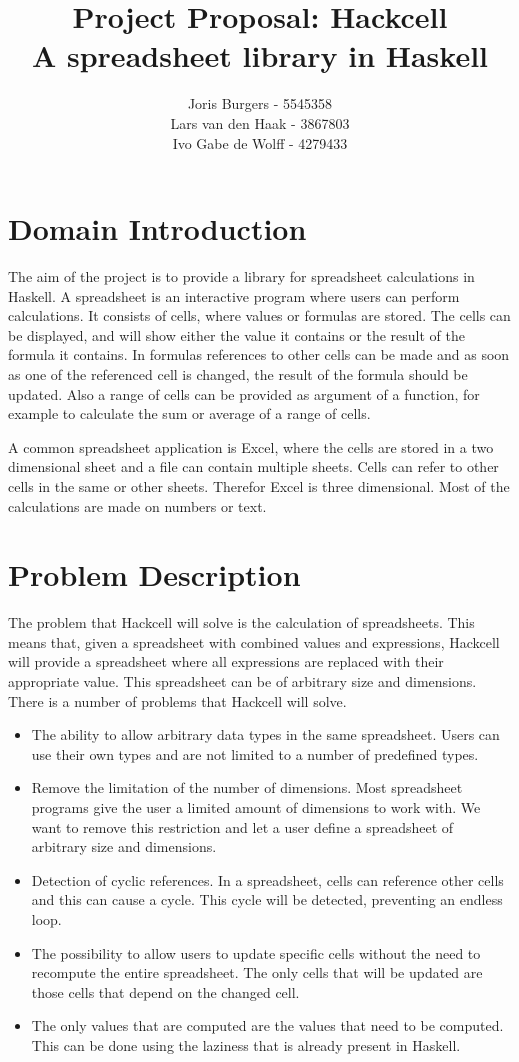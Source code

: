\documentclass{article}
\title{
	Project Proposal: Hackcell \\
	\vskip 0.5cm
	\large{A spreadsheet library in Haskell}
}
\author{Joris Burgers - 5545358\\ Lars van den Haak - 3867803\\ Ivo Gabe de Wolff - 4279433}
\begin{document}
	\maketitle
	\section{Domain Introduction}
	The aim of the project is to provide a library for spreadsheet calculations in Haskell. A spreadsheet is an interactive program where users can perform calculations. It consists of cells, where values or formulas are stored. The cells can be displayed, and will show either the value it contains or the result of the formula it contains. In formulas references to other cells can be made and as soon as one of the referenced cell is changed, the result of the formula should be updated. Also a range of cells can be provided as argument of a function, for example to calculate the sum or average of a range of cells. 
	
	A common spreadsheet application is Excel, where the cells are stored in a two dimensional sheet and a file can contain multiple sheets. Cells can refer to other cells in the same or other sheets. Therefor Excel is three dimensional. Most of the calculations are made on numbers or text. 
	
	\section{Problem Description}
	The problem that Hackcell will solve is the calculation of spreadsheets. This means that, given a spreadsheet with combined values and expressions, Hackcell will provide a spreadsheet where all expressions are replaced with their appropriate value. This spreadsheet can be of arbitrary size and dimensions. There is a number of problems that Hackcell will solve.
\begin{itemize}
	\item The ability to allow arbitrary data types in the same spreadsheet. Users can use their own types and are not limited to a number of predefined types. 
	\item Remove the limitation of the number of dimensions. Most spreadsheet programs give the user a limited amount of dimensions to work with. We want to remove this restriction and let a user define a spreadsheet of arbitrary size and dimensions.
	\item Detection of cyclic references. In a spreadsheet, cells can reference other cells and this can cause a cycle. This cycle will be detected, preventing an endless loop.
	\item The possibility to allow users to update specific cells without the need to recompute the entire spreadsheet. The only cells that will be updated are those cells that depend on the changed cell.
	\item The only values that are computed are the values that need to be computed. This can be done using the laziness that is already present in Haskell. 
\end{itemize}	
	
\end{document}
